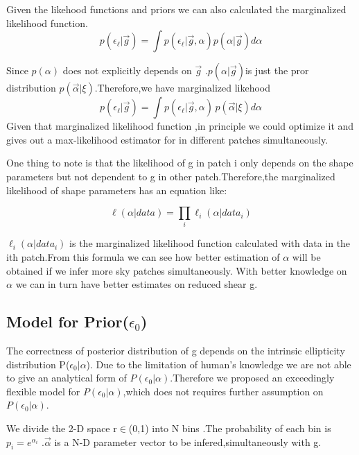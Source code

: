 \documentclass[useAMS,usenatbib]{mn2e}
\begin{document}
Given the likehood functions and priors we can also calculated the
marginalized likelihood function.
\begin{equation}
p(\epsilon_{\ell}|\vec{g})=\int p(\epsilon_{\ell}|\vec{g},\alpha)p(\alpha|\vec{g})d\alpha
\end{equation}


Since $p(\alpha)$ does not explicitly depends on $\vec{g}$ .$p(\alpha|\vec{g})$is
just the pror distribution $p(\vec{\alpha}|\xi)$.Therefore,we have marginalized likehood
\begin{equation}
p(\epsilon_{\ell}|\vec{g})=\int p(\epsilon_{\ell}|\vec{g},\alpha)\,p(\vec{\alpha}|\xi)d\alpha
\end{equation}
Given that marginalized likelihood function ,in principle we could optimize it  and gives out a max-likelihood estimator 
for  in different patches simultaneously.


One thing to note is that the likelihood of g in patch i only depends
on the shape parameters but not dependent to g in other patch.Therefore,the
marginalized likelihood of shape parameters has an equation like:

\begin{equation}
\ell(\alpha|data)=\prod_{i}\ell_{i}(\alpha|data_{i})
\end{equation}


$\ell_{i}(\alpha|data_{i})$ is the marginalized likelihood function
calculated with data in the ith patch.From this formula we can see
how better estimation of $\alpha$ will be obtained if we infer more
sky patches simultaneously. With better knowledge on $\alpha$ we can
in turn have better estimates on reduced shear g.


\subsection{Model for Prior($\epsilon_{0}$)}

The correctness of posterior distribution of g depends on the intrinsic
ellipticity distribution P($\epsilon_{0}|\alpha$). Due to the limitation
of human's knowledge we are not able to give an analytical form of
$P(\epsilon_{0}|\alpha)$.Therefore we proposed an exceedingly flexible
model for $P(\epsilon_{0}|\alpha)$,which does not requires further
assumption on $P(\epsilon_{0}|\alpha)$.

We divide the 2-D space r$\in$(0,1) into N bins .The probability
of each bin is $p_{i}=e^{\alpha_{i}}$ .$\overrightarrow{\alpha}$
is a N-D parameter vector to be infered,simultaneously with g.
\end{document}
